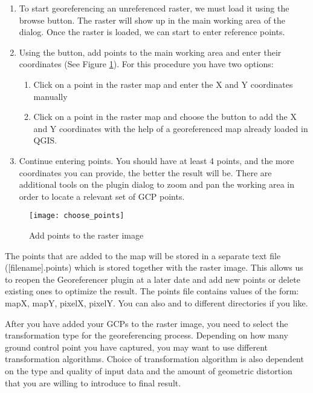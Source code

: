 \label{georeferencer_entering}

\begin{enumerate}
\item To start georeferencing an unreferenced raster, we must load it using the \browsebutton browse button. The raster will show up in the main working area of the dialog. Once the raster is loaded, we can start to enter reference points.

\item Using the  button, add points to the main working area and enter their coordinates (See Figure \ref{fig:choose_points}). For this procedure you have two options:

\begin{enumerate}
\item Click on a point in the raster map and enter the X and Y coordinates manually
\item Click on a point in the raster map and choose the button  to add the X and Y coordinates with the help of a georeferenced map already loaded in QGIS.
\end{enumerate}
\item Continue entering points. You should have at least 4 points, and the more coordinates you can provide, the better the result will be. There are additional tools on the plugin dialog to zoom and pan the working area in order to locate a relevant set of GCP points.
\end{enumerate}

\begin{figure}[ht]
\centering
  \texttt{[image: choose\_points]}
  \caption{Add points to the raster image \nixcaption}\label{fig:choose_points}
\end{figure}

The points that are added to the map will be stored in a separate text file ([filename].points) which is stored together with the raster image. This allows us to reopen the Georeferencer plugin at a later date and add new points or delete existing ones to optimize the result. The points file contains values of the form: mapX, mapY, pixelX, pixelY. You can also  and  to different directories if you like.

\label{georeferencer_transformation}

After you have added your GCPs to the raster image, you need to select the transformation type for the georeferencing process. Depending on how many ground control point you have captured, you may want to use different transformation algorithms. Choice of transformation algorithm is also dependent on the type and quality of input data and the amount of geometric distortion that you are willing to introduce to final result.

